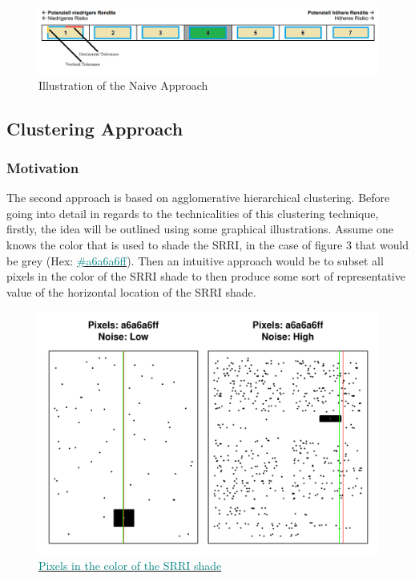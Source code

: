 \documentclass[aodsor,preprint]{imsart}
\numberwithin{equation}{section}
\theoremstyle{plain}
\begin{document}
\begin{figure}[H]
	\includegraphics[width = 12cm]{example_SRRI_graph_naive}
	\caption{Illustration of the Naive Approach}
\end{figure}
\newpage
\subsection{Clustering Approach}
\subsubsection{Motivation}
The second approach is based on agglomerative hierarchical clustering. Before going into detail in regards to the technicalities of this clustering technique, firstly, the idea will be outlined using some graphical illustrations. Assume one knows the color that is used to shade the SRRI, in the case of figure 3 that would be grey (Hex: \href{https://www.color-hex.com/color/a6a6a6}{\textcolor{teal}{\#a6a6a6ff}}). Then an intuitive approach would be to subset all pixels in the color of the SRRI shade to then produce some sort of representative value of the horizontal location of the SRRI shade.

\begin{figure}[H]
	\includegraphics[width = 12cm]{highnoiselownoise.pdf}
	\caption{\href{https://github.com/Base-R-Best-R/KID/blob/main/Code/Tests/Shade_ext.pdf}{\textcolor{teal}{Pixels in the color of the SRRI shade}}}
\end{figure}
\end{document}

